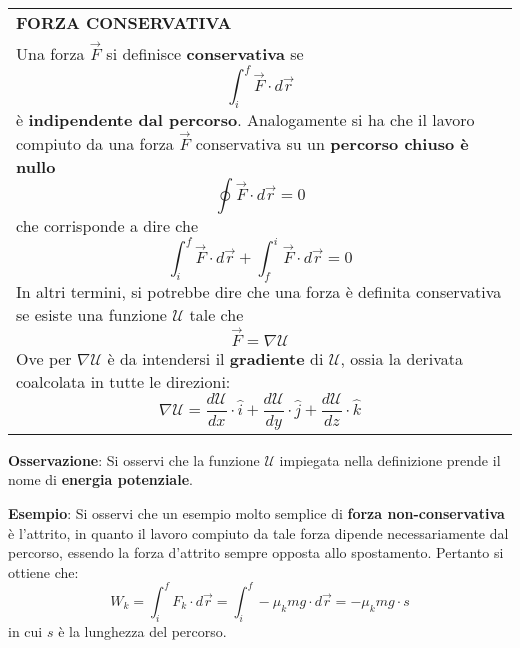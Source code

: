 \documentclass[a4paper]{extarticle}
\renewcommand\arraystretch{}
\begin{document}
\vspace{1em}
\setlength{\tabcolsep}{14pt}
\renewcommand{\arraystretch}{2}
\noindent
\begin{tabularx}{\textwidth}{@{}|P|@{}}
    \hline
    {\textbf{FORZA CONSERVATIVA}}\\
    \parbox{\linewidth}{Una forza $\vec F$ si definisce \textbf{conservativa} se
    \[\boxed{\int_i^f \vec F \cdot d \vec r}\]
    è \textbf{indipendente dal percorso}. Analogamente si ha che il lavoro compiuto da una forza $\vec F$ conservativa su un \textbf{percorso chiuso è nullo}
    \[\boxed{\oint \vec F \cdot d \vec r = 0}\]
    che corrisponde a dire che
    \[\boxed{\int_i^f \vec F \cdot d \vec r + \int_f^i \vec F \cdot d \vec r = 0}\]
    In altri termini, si potrebbe dire che una forza è definita conservativa se esiste una funzione $\mathcal{U}$ tale che
    \[\boxed{\vec F = \nabla \mathcal{U}}\]
    Ove per $\nabla \mathcal{U}$ è da intendersi il \textbf{gradiente} di $\mathcal{U}$, ossia la derivata coalcolata in tutte le direzioni:
    \[\nabla \mathcal{U} = \frac{d \mathcal{U}}{d x} \cdot \hat{i} + \frac{d \mathcal{U}}{d y} \cdot \hat{j} + \frac{d \mathcal{U}}{d z} \cdot \hat{k}\]
    \vspace{-1mm}}\\
    \hline
\end{tabularx}

\vspace{1em}
\noindent
\textbf{Osservazione}: Si osservi che la funzione $\mathcal{U}$ impiegata nella definizione prende il nome di \textbf{energia potenziale}.

\vspace{1em}
\noindent
\textbf{Esempio}: Si osservi che un esempio molto semplice di \textbf{forza non-conservativa} è l'attrito, in quanto il lavoro compiuto da tale forza dipende necessariamente dal percorso, essendo la forza d'attrito sempre opposta allo spostamento. Pertanto si ottiene che:
\[W_k = \int_i^f F_k \cdot d \vec r = \int_i^f -\mu_k m g \cdot d \vec r = -\mu_k m g \cdot s\]
in cui $s$ è la lunghezza del percorso.
\end{document}
